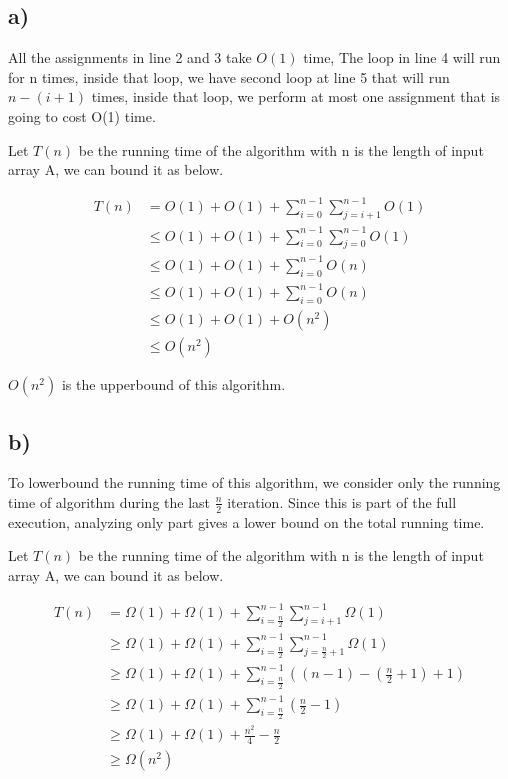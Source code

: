 \documentclass{article}
\begin{document}
	\subsection*{a)}

	All the assignments in line 2 and 3 take \(O(1)\) time, The loop in line 4 will run for n times, inside that loop, we have second loop at line 5 that will run \(n - (i + 1)\) times, inside that loop, we perform at most one assignment that is going to cost O(1) time.   
	
	Let \(T(n)\) be the running time of the algorithm with n is the length of input array A, we can bound it as below.

	\begin{align*}
		T(n) &=O(1) + O(1) + \sum_{i = 0}^{n - 1}\sum_{j = i + 1}^{n - 1} O(1)\\
		&\leq O(1) + O(1) + \sum_{i = 0}^{n - 1} \sum_{j = 0}^{n - 1} O(1)\\
		&\leq O(1) + O(1) + \sum_{i = 0}^{n - 1} O(n)\\
		&\leq O(1) + O(1) + \sum_{i = 0}^{n - 1} O(n)\\
		&\leq O(1) + O(1) + O(n^2)\\
		&\leq O(n^2)
	\end{align*}

	\(O(n^2)\) is the upperbound of this algorithm.

	\subsection*{b)}
	To lowerbound the running time of this algorithm, we consider only the running time of algorithm during the last \(\frac{n}{2}\) iteration. Since this is part of the full execution, analyzing only part  gives a lower bound on the total running time.

	Let \(T(n)\) be the running time of the algorithm with n is the length of input array A, we can bound it as below.
	
	\begin{align*}
		T(n) &=\Omega(1) + \Omega(1) + \sum_{i = \frac{n}{2}}^{n - 1}\sum_{j = i + 1}^{n - 1} \Omega(1)\\
		&\geq \Omega(1) + \Omega(1) + \sum_{i = \frac{n}{2}}^{n - 1}\sum_{j = \frac{n}{2} + 1}^{n - 1} \Omega(1)\\
		&\geq \Omega(1) + \Omega(1) + \sum_{i = \frac{n}{2}}^{n - 1}((n - 1) - (\frac{n}{2} + 1) + 1)\\
		&\geq \Omega(1) + \Omega(1) + \sum_{i = \frac{n}{2}}^{n - 1}(\frac{n}{2} - 1)\\
		&\geq \Omega(1) + \Omega(1) + \frac{n^2}{4} - \frac{n}{2}\\
		&\geq \Omega(n^2)
	\end{align*}
\end{document}
